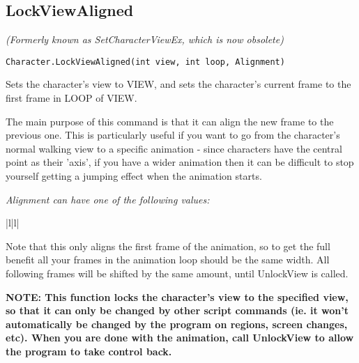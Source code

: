 \subsection{LockViewAligned}\label{Character.LockViewAligned}%

\it{(Formerly known as SetCharacterViewEx, which is now obsolete)}

\begin{verbatim}
Character.LockViewAligned(int view, int loop, Alignment)
\end{verbatim}

Sets the character's view to VIEW, and sets the character's current frame to
the first frame in LOOP of VIEW.

The main purpose of this command is that it can align the new frame to the previous one.
This is particularly useful if you want to go from the character's normal walking view to
a specific animation - since characters have the central point as their 'axis', if
you have a wider animation then it can be difficult to stop yourself getting a jumping
effect when the animation starts.

\it{Alignment} can have one of the following values:

\begin{tabular}{|l|l|}
\end{tabular}

Note that this only aligns the first frame of the animation, so to get the full benefit
all your frames in the animation loop should be the same width. All following frames will
be shifted by the same amount, until UnlockView is called.

\bf{NOTE:} This function locks the character's view to the specified view, so
that it can only be changed by other script commands (ie. it won't
automatically be changed by the program on regions, screen changes,
etc). When you are done with the animation, call UnlockView to
allow the program to take control back.

